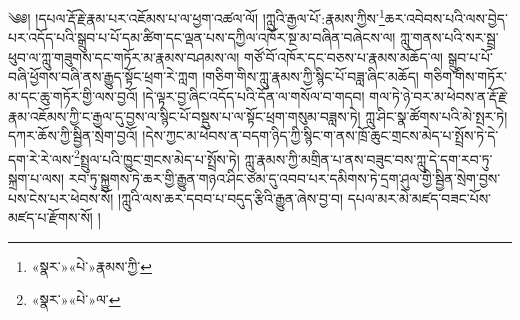 ༄༅། །དཔལ་རྡོ་རྗེ་རྣམ་པར་འཇོམས་པ་ལ་ཕྱག་འཚལ་ལོ། །ཀླུའི་རྒྱལ་པོ་:རྣམས་ཀྱིས་\footnote{«སྣར་»«པེ་»རྣམས་ཀྱི་}ཆར་འབེབས་པའི་ལས་བྱེད་པར་འདོད་པའི་སྒྲུབ་པ་པོ་དམ་ཚིག་དང་ལྡན་པས་དཀྱིལ་འཁོར་སྔ་མ་བཞིན་བཞེངས་ལ། ཀླུ་གནས་པའི་སར་སྦྲ་ཕུབ་ལ་ཀླུ་གཟུགས་དང་གཏོར་མ་རྣམས་བཤམས་ལ། གཙོ་བོ་འཁོར་དང་བཅས་པ་རྣམས་མཆོད་ལ། སྒྲུབ་པ་པོ་བཞི་ཕྱོགས་བཞི་ནས་རྒྱུད་སྟོང་ཕྲག་རེ་ཀླག །གཅིག་གིས་ཀླུ་རྣམས་ཀྱི་སྙིང་པོ་བཟླ་ཞིང་མཆོད། གཅིག་གིས་གཏོར་མ་དང་ཆུ་གཏོར་གྱི་ལས་བྱའོ། །དེ་ལྟར་བྱ་ཞིང་འདོད་པའི་དོན་ལ་གསོལ་བ་གདབ། གལ་ཏེ་ཉེ་བར་མ་ཕེབས་ན་རྡོ་རྗེ་རྣམ་འཇོམས་ཀྱི་ང་རྒྱལ་དུ་བྱས་ལ་སྙིང་པོ་བསྡུས་པ་ལ་སྟོང་ཕྲག་གསུམ་བཟླས་ཏེ། ཀླུ་ཤིང་སྣ་ཚོགས་པའི་མེ་སྤར་ཏེ། དཀར་ཆོས་ཀྱི་སྦྱིན་སྲེག་བྱའོ། །དེས་ཀྱང་མ་ཕེབས་ན་བདག་ཉིད་ཀྱི་སྙིང་ག་ནས་ཁྲོ་ཆུང་གྲངས་མེད་པ་སྤྲོས་ཏེ་དེ་དག་རེ་རེ་ལས་\footnote{«སྣར་»«པེ་»ལ་}སྤྲུལ་པའི་ཁྱུང་གྲངས་མེད་པ་སྤྲོས་ཏེ། ཀླུ་རྣམས་ཀྱི་མགྲིན་པ་ནས་བཟུང་བས་ཀླུ་དེ་དག་རབ་ཏུ་སྐྲག་པ་ལས། རབ་ཏུ་སྐྱུགས་ཏེ་ཆར་གྱི་རྒྱུན་གཉའ་ཤིང་ཙམ་དུ་འབབ་པར་དམིགས་ཏེ་དྲག་ཤུལ་གྱི་སྦྱིན་སྲེག་བྱས་པས་ངེས་པར་ཕེབས་སོ། །ཀླུའི་ལས་ཆར་དབབ་པ་བདུད་རྩིའི་རྒྱུན་ཞེས་བྱ་བ། དཔལ་མར་མེ་མཛད་བཟང་པོས་མཛད་པ་རྫོགས་སོ། ། 